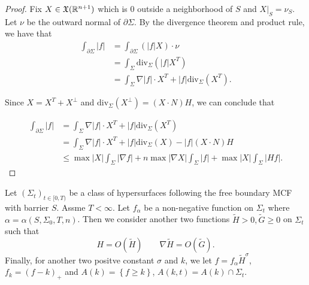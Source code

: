 \begin{proof}
    Fix $X \in \mathfrak{X} (\mathbb{R}^{n+1})$ which is 0 outside a neighborhood of $S$ and $X|_S=\nu _S$. Let $\nu$ be the outward normal of $\partial \Sigma $. By the divergence theorem and product rule, we have that
    \begin{equation}
    \begin{split}
        \int_{\partial \Sigma} \left| f \right| 
        & = \int_{\partial \Sigma} \left(\left| f \right| X \right) \cdot \nu \\
    &=  \int_{\Sigma} \mathrm{div}  _{\Sigma } \left( \left| f \right| X^T \right)  \\
    &= \int_{\Sigma} \nabla \left| f \right| \cdot X^T + \left| f \right| \mathrm{div}  _{\Sigma } (X^T).
    \end{split}
    \end{equation}

    Since $X=X^T+X^\bot $ and $\mathrm{div}_{\Sigma }(X^\bot)=(X \cdot N)H $, we can conclude that

    \begin{equation}
        \begin{split}
            \int_{\partial \Sigma} \left| f \right| 
        &= \int_{\Sigma} \nabla \left| f \right| \cdot X^T + \left| f \right| \mathrm{div}  _{\Sigma } (X^T)\\
        &= \int_{\Sigma} \nabla \left| f \right| \cdot X^T + \left| f \right| \mathrm{div}  _{\Sigma } (X) - \left| f \right| \left(X \cdot N \right)H\\
        &\leq \max \left| X \right| \int_{\Sigma} \left| \nabla f \right| + n \max \left| \nabla X \right| \int_{\Sigma} \left| f \right| + \max \left| X \right| \int_{\Sigma} \left| Hf \right| .
        \end{split}
        \end{equation} 
\end{proof}

Let $\left( \Sigma _t \right) _{t \in [0,T)}$ be a class of hypersurfaces following the free boundary MCF with barrier $S$. Assme $T<\infty $. Let $f_{\alpha }$ be a non-negative function on $\Sigma _t$ where $\alpha = \alpha (S, \Sigma _0,T,n)$. Then we consider another two functions $\tilde{H}>0,\tilde{G}\geq 0$ on $\Sigma _t$ such that 
\[
    H=O(\tilde{H}) \qquad \nabla \tilde{H}=O(\tilde{G}).    
\]
Finally, for another two positve constant $\sigma$ and $k$, we let $f=f_{\alpha }\tilde{H}^{\sigma }$, $f_k=\left( f-k \right) _{+}$ and $A(k)=\left\{ f \geq k \right\} $, $A(k,t)=A(k)\cap \Sigma _t$.

